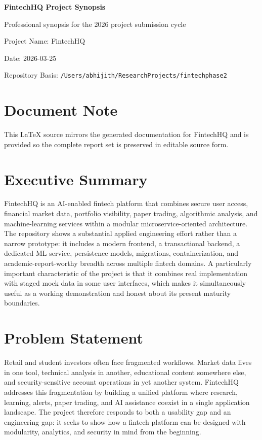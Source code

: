 \documentclass[11pt,a4paper]{article}
\begin{document}
\begin{titlepage}
\centering
\vspace*{2cm}
{\Huge \textbf{FintechHQ Project Synopsis}\par}
\vspace{0.6cm}
{\Large Professional synopsis for the 2026 project submission cycle\par}
\vspace{1.2cm}
{\large Project Name: FintechHQ\par}
\vspace{0.3cm}
{\large Date: 2026-03-25\par}
\vfill
{\large Repository Basis: \texttt{/Users/abhijith/ResearchProjects/fintechphase2}\par}
\end{titlepage}
\section*{Document Note}
This LaTeX source mirrors the generated documentation for FintechHQ and is provided so the complete report set is preserved in editable source form.
\section{Executive Summary}
FintechHQ is an AI-enabled fintech platform that combines secure user access, financial market data, portfolio visibility, paper trading, algorithmic analysis, and machine-learning services within a modular microservice-oriented architecture. The repository shows a substantial applied engineering effort rather than a narrow prototype: it includes a modern frontend, a transactional backend, a dedicated ML service, persistence models, migrations, containerization, and academic-report-worthy breadth across multiple fintech domains. A particularly important characteristic of the project is that it combines real implementation with staged mock data in some user interfaces, which makes it simultaneously useful as a working demonstration and honest about its present maturity boundaries.
\section{Problem Statement}
Retail and student investors often face fragmented workflows. Market data lives in one tool, technical analysis in another, educational content somewhere else, and security-sensitive account operations in yet another system. FintechHQ addresses this fragmentation by building a unified platform where research, learning, alerts, paper trading, and AI assistance coexist in a single application landscape. The project therefore responds to both a usability gap and an engineering gap: it seeks to show how a fintech platform can be designed with modularity, analytics, and security in mind from the beginning.
\end{document}
